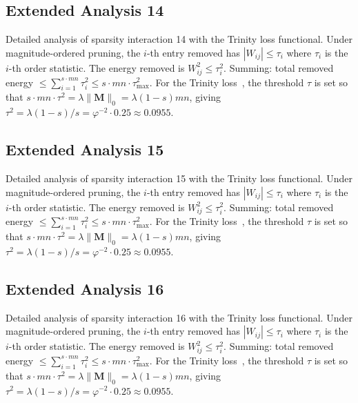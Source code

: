 \subsection{Extended Analysis 14}
\label{subsec:ext-14}

Detailed analysis of sparsity interaction 14 with the Trinity
loss functional.  Under magnitude-ordered pruning, the $i$-th entry removed has
$|W_{ij}| \leq \tau_i$ where $\tau_i$ is the $i$-th order statistic.  The
energy removed is $W_{ij}^2 \leq \tau_i^2$.  Summing: total removed energy
$\leq \sum_{i=1}^{s \cdot mn} \tau_i^2 \leq s \cdot mn \cdot \tau_{\max}^2$.
For the Trinity loss~\cite{hanetal2015deep}, the threshold $\tau$ is set so that
$s \cdot mn \cdot \tau^2 = \lambda \|\mathbf{M}\|_0 = \lambda (1-s) mn$, giving
$\tau^2 = \lambda(1-s)/s = \varphi^{-2} \cdot 0.25 \approx 0.0955$.


\subsection{Extended Analysis 15}
\label{subsec:ext-15}

Detailed analysis of sparsity interaction 15 with the Trinity
loss functional.  Under magnitude-ordered pruning, the $i$-th entry removed has
$|W_{ij}| \leq \tau_i$ where $\tau_i$ is the $i$-th order statistic.  The
energy removed is $W_{ij}^2 \leq \tau_i^2$.  Summing: total removed energy
$\leq \sum_{i=1}^{s \cdot mn} \tau_i^2 \leq s \cdot mn \cdot \tau_{\max}^2$.
For the Trinity loss~\cite{hanetal2015deep}, the threshold $\tau$ is set so that
$s \cdot mn \cdot \tau^2 = \lambda \|\mathbf{M}\|_0 = \lambda (1-s) mn$, giving
$\tau^2 = \lambda(1-s)/s = \varphi^{-2} \cdot 0.25 \approx 0.0955$.


\subsection{Extended Analysis 16}
\label{subsec:ext-16}

Detailed analysis of sparsity interaction 16 with the Trinity
loss functional.  Under magnitude-ordered pruning, the $i$-th entry removed has
$|W_{ij}| \leq \tau_i$ where $\tau_i$ is the $i$-th order statistic.  The
energy removed is $W_{ij}^2 \leq \tau_i^2$.  Summing: total removed energy
$\leq \sum_{i=1}^{s \cdot mn} \tau_i^2 \leq s \cdot mn \cdot \tau_{\max}^2$.
For the Trinity loss~\cite{hanetal2015deep}, the threshold $\tau$ is set so that
$s \cdot mn \cdot \tau^2 = \lambda \|\mathbf{M}\|_0 = \lambda (1-s) mn$, giving
$\tau^2 = \lambda(1-s)/s = \varphi^{-2} \cdot 0.25 \approx 0.0955$.


